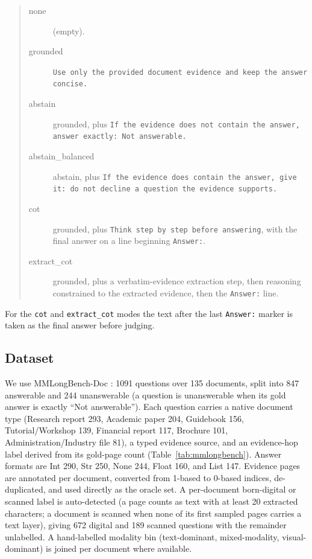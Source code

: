 \begin{quote}\small
\begin{description}
\item[none] (empty).
\item[grounded] \texttt{Use only the provided document evidence and keep the answer concise.}
\item[abstain] grounded, plus \texttt{If the evidence does not contain the answer, answer exactly: Not answerable.}
\item[abstain\_balanced] abstain, plus \texttt{If the evidence does contain the answer, give it: do not decline a question the evidence supports.}
\item[cot] grounded, plus \texttt{Think step by step before answering}, with the final answer on a line beginning \texttt{Answer:}.
\item[extract\_cot] grounded, plus a verbatim-evidence extraction step, then reasoning constrained to the extracted evidence, then the \texttt{Answer:} line.
\end{description}
\end{quote}

For the \texttt{cot} and \texttt{extract\_cot} modes the text after the last \texttt{Answer:} marker is taken as the final answer before judging.

\subsection{Dataset}
\label{app:cfg_dataset}
We use MMLongBench-Doc \cite{ma2024mmlongbench}: 1091 questions over 135 documents, split into 847 answerable and 244 unanswerable (a question is unanswerable when its gold answer is exactly ``Not answerable''). Each question carries a native document type (Research report 293, Academic paper 204, Guidebook 156, Tutorial/Workshop 139, Financial report 117, Brochure 101, Administration/Industry file 81), a typed evidence source, and an evidence-hop label derived from its gold-page count (Table~\ref{tab:mmlongbench}). Answer formats are Int 290, Str 250, None 244, Float 160, and List 147. Evidence pages are annotated per document, converted from 1-based to 0-based indices, de-duplicated, and used directly as the oracle set. A per-document born-digital or scanned label is auto-detected (a page counts as text with at least 20 extracted characters; a document is scanned when none of its first sampled pages carries a text layer), giving 672 digital and 189 scanned questions with the remainder unlabelled. A hand-labelled modality bin (text-dominant, mixed-modality, visual-dominant) is joined per document where available.

